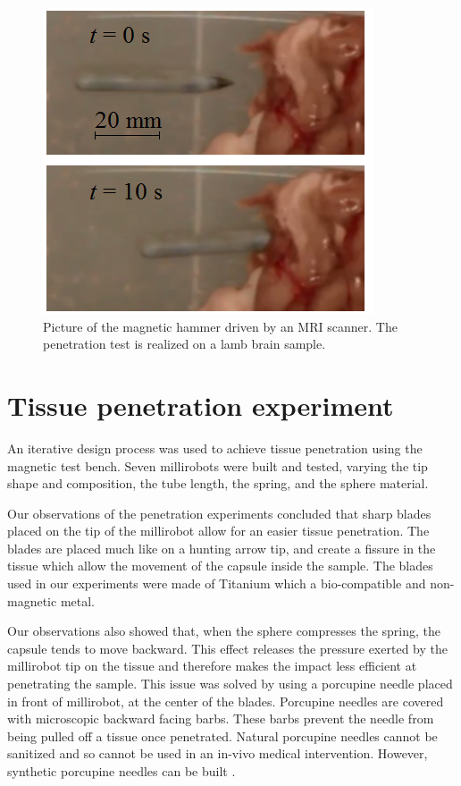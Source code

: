 \documentclass[letterpaper, 10 pt, conference]{ieeeconf}  %
\begin{document}
\begin{figure}
\centering
  \includegraphics[width=120 pt]{tests_in_MRI.png}
  \caption{Picture of the magnetic hammer driven by an MRI scanner. The penetration test is realized on a lamb brain sample.}
  \label{MRI_test}
	\vspace{-1em}
\end{figure}

\section{Tissue penetration experiment}

An iterative design process was used to achieve tissue penetration using the magnetic test bench. Seven millirobots were built and tested, varying the tip shape and composition, the tube length, the spring, and the sphere material. \par
Our observations of the penetration experiments concluded that sharp blades placed on the tip of the millirobot allow for an easier tissue penetration. The blades are placed much like on a hunting arrow tip, and create a fissure in the tissue which allow the movement of the capsule inside the sample. The blades used in our experiments were made of Titanium which a bio-compatible and non-magnetic metal.\par
Our observations also showed that, when the sphere compresses the spring, the capsule tends to move backward. This effect releases the pressure exerted by the millirobot tip on the tissue and therefore makes the impact less efficient at penetrating the sample. This issue was solved by using a porcupine needle placed in front of millirobot, at the center of the blades. Porcupine needles are covered with microscopic backward facing barbs. These barbs prevent the needle from being pulled off a tissue once penetrated. Natural porcupine needles cannot be sanitized and so cannot be used in an in-vivo medical intervention. However, synthetic porcupine needles can be built \cite{cho2012microstructured}.\par
\end{document}
